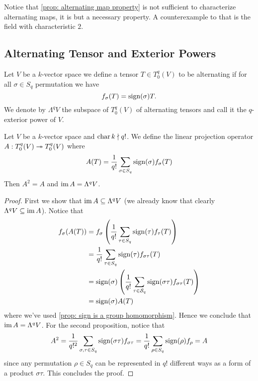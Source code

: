 \begin{remark}
  Notice that \cref{prop: alternating map property} is not sufficient to
  characterize alternating maps, it is but a necessary property. A
  counterexample to that is the field with characteristic \(2\).
\end{remark}

\subsection{Alternating Tensor and Exterior Powers}

\begin{definition}
  \label{def: alternating tensor}
  Let \(V\) be a \(k\)-vector space we define a tensor \(T \in T_0^q(V)\) to be
  alternating if for all \(\sigma \in S_q\) permutation we have
  \[
    f_\sigma(T) = \operatorname{sign}(\sigma) T.
  \]
  We denote by \(\Lambda^q V\) the subspace of \(T_0^q(V)\) of alternating
  tensors and call it the \(q\)-exterior power of \(V\).
\end{definition}

\begin{proposition}
  \label{prop: alternating projection}
  Let \(V\) be a \(k\)-vector space and \(\operatorname{char} k \nmid q!\). We
  define the linear projection operator \(A: T_0^q(V) \twoheadrightarrow T_0^q(V)\) where
  \[
    A(T) = \frac{1}{q!} \sum_{\sigma \in S_q} \operatorname{sign}(\sigma)
    f_\sigma(T)
  \]
  Then \(A^2 = A\) and \(\operatorname{im} A = \Lambda^q V\).
\end{proposition}

\begin{proof}
  First we show that \(\operatorname{im} A \subseteq \Lambda^q V\) (we already know that
  clearly \(\Lambda^q V \subseteq \operatorname{im} A\)). Notice that
  \begin{align*}
    f_\sigma(A(T))
    &= f_\sigma \left( \frac 1 {q!} \sum_{\tau \in S_q}
    \operatorname{sign}(\tau) f_\tau(T) \right) \\
    &= \frac 1 {q!} \sum_{\tau \in S_q} \operatorname{sign}(\tau)
    f_{\sigma \tau}(T) \\
    &= \operatorname{sign}(\sigma) \left( \frac 1 {q!} \sum_{\tau \in \mathcal
    S_q} \operatorname{sign}(\sigma \tau) f_{\sigma \tau}(T) \right) \\
    &= \operatorname{sign}(\sigma) A(T)
  \end{align*}
  where we've used \cref{prop: sign is a group homomorphism}. Hence we conclude
  that \(\operatorname{im} A = \Lambda^q V\). For the second proposition, notice that
  \[
    A^2 = \frac 1 {q!^2} \sum_{\sigma, \tau \in S_q}
    \operatorname{sign}(\sigma \tau) f_{\sigma \tau}
    = \frac 1 {q!} \sum_{\rho \in S_q} \operatorname{sign}(\rho)
    f_\rho = A
  \]
  since any permutation \(\rho \in S_q\) can be represented in \(q!\)
  different ways as a form of a product \(\sigma \tau\). This concludes the
  proof.
\end{proof}

